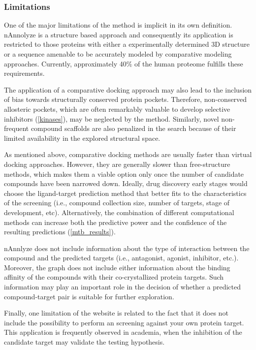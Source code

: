 \documentclass[11pt, b5paper,twoside]{tesi_upf}
\begin{document}
\subsubsection{Limitations}
 \par One of the major limitations of the method is implicit in its own definition. nAnnolyze is a structure based approach and consequently its application is restricted to those proteins with either a experimentally determined 3D structure or a sequence amenable to be accurately modeled by comparative modeling approaches. Currently, approximately 40$\%$ of the human proteome fulfills these requirements.
 \par The application of a comparative docking approach may also lead to the inclusion of bias towards structurally conserved protein pockets. Therefore, non-conserved allosteric pockets, which are often remarkably valuable to develop selective inhibitors (\cref{kinases}), may be neglected by the method. Similarly, novel non-frequent compound scaffolds are also penalized in the search because of their limited availability in the explored structural space. 
 \par As mentioned above, comparative docking methods are usually faster than virtual docking approaches. However, they are generally slower than free-structure methods, which makes them a viable option only once the number of candidate compounds have been narrowed down. Ideally, drug discovery early stages would choose the ligand-target prediction method that better fits to the characteristics of the screening (i.e., compound collection size, number of targets, stage of development, etc). Alternatively, the combination of different computational methods can increase both the predictive power and the confidence of the resulting predictions (\cref{mtb_results}). 
 \par nAnnlyze does not include information about the type of interaction between the compound and the predicted targets (i.e., antagonist, agonist, inhibitor, etc.). Moreover, the graph does not include either information about the binding affinity of the compounds with their co-crystallized protein targets. Such information may play an important role in the decision of whether a predicted compound-target pair is suitable for further exploration. 
  
 \par Finally, one limitation of the website is related to the fact that it does not include the possibility to perform an screening against your own protein target. This application is frequently observed in academia, when the inhibition of the candidate target may validate the testing hypothesis. 
\end{document}

